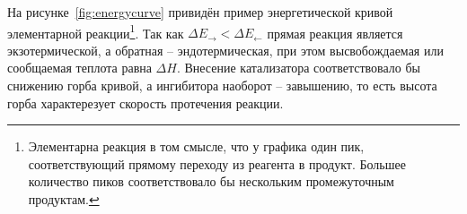 На рисунке~\ref{fig:energycurve} привидён пример энергетической кривой элементарной реакции\footnote{Элементарна реакция в том смысле, что у графика один пик, соответствующий прямому переходу из реагента в продукт. Большее количество пиков соответствовало бы нескольким промежуточным продуктам.}. Так как $\Delta E_{\longrightarrow} < \Delta E_{\longleftarrow}$ прямая реакция является экзотермической, а обратная -- эндотермическая, при этом высвобождаемая или сообщаемая теплота равна $\Delta H$. Внесение катализатора соответствовало бы снижению горба кривой, а ингибитора наоборот -- завышению, то есть высота горба характерезует скорость протечения реакции.
